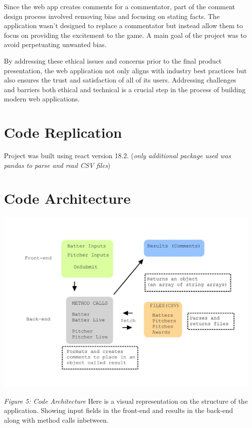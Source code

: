 \documentclass[10pt,twocolumn]{article}
\begin{document}
Since the web app creates comments for a commentator, part of the comment design process involved removing bias and focusing on stating facts. The application wasn’t designed to replace a commentator but instead allow them to focus on providing the excitement to the game. A main goal of the project was to avoid perpetuating unwanted bias. 

By addressing these ethical issues and concerns prior to the final product presentation, the web application not only aligns with industry best practices but also ensures the trust and satisfaction of all of its users. Addressing challenges and barriers both ethical and technical is a crucial step in the process of building modern web applications. 

\section{Code Replication}

Project was built using react version 18.2. (\textit{only additional package used was pandas to parse and read CSV files})

\section{Code Architecture}

\includegraphics[scale=0.20]{images/arch.jpg}

\textit{Figure 5: Code Architecture}
\newline
Here is a visual representation on the structure of the application. Showing input fields in the front-end and results in the back-end along with method calls inbetween. 

\printbibliography
\end{document}

